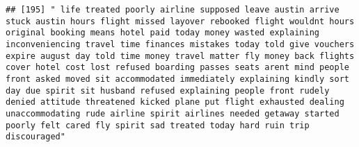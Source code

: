 \documentclass[
]{article}
\begin{document}
\begin{verbatim}
## [195] " life treated poorly airline supposed leave austin arrive stuck austin hours flight missed layover rebooked flight wouldnt hours original booking means hotel paid today money wasted explaining inconveniencing travel time finances mistakes today told give vouchers expire august day told time money travel matter fly money back flights cover hotel cost lost refused boarding passes seats arent mind people front asked moved sit accommodated immediately explaining kindly sort day due spirit sit husband refused explaining people front rudely denied attitude threatened kicked plane put flight exhausted dealing unaccommodating rude airline spirit airlines needed getaway started poorly felt cared fly spirit sad treated today hard ruin trip discouraged"                                                                                                                                                                                                                                                                                                                                                                                                                                                                                                                                                                                                                                                                                                                                                                                                                                                                                                                                                                                                               

\end{verbatim}
\end{document}
